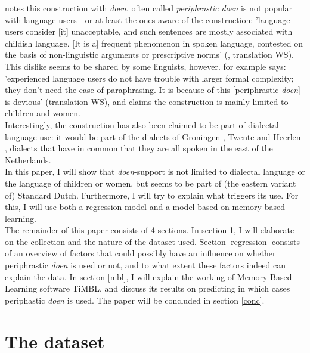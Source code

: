 \documentclass[12pt]{article}
\begin{document}
\citet{g83} notes this construction with \emph{doen}, often called \emph{periphrastic doen} is not popular with language users - or at least the ones aware of the construction: 'language users consider [it] unacceptable, and such sentences are mostly associated with childish language. [It is a] frequent phenomenon in spoken language, contested on the basis of non-linguistic arguments or prescriptive norms' (\citealp[p. 58]{g83}, translation WS).\\\indent
This dislike seems to be shared by some linguists, however. \citet[p. 121]{d94} for example says: 'experienced language users do not have trouble with larger formal complexity; they don't need the ease of paraphrasing. It is because of this [periphrastic \emph{doen}] is devious' (translation WS), and \citet[p. 153]{n62} claims the construction is mainly limited to children and women.\\\indent
Interestingly, the construction has also been claimed to be part of dialectal language use: it would be part of the dialects of Groningen \citep{tl53}, Twente \citep{n62} and Heerlen \citep{c94}, dialects that have in common that they are all spoken in the east of the Netherlands.\\\indent
In this paper, I will show that \emph{doen}-support is not limited to dialectal language or the language of children or women,  but seems to be part of (the eastern variant of) Standard Dutch. Furthermore, I will try to explain what triggers its use. For this, I will use both a regression model and a model based on memory based learning.\\\indent
The remainder of this paper consists of 4 sections. In section \ref{data}, I will elaborate on the collection and the nature of the dataset used. Section \ref{regression} consists of an overview of factors that could possibly have an influence on whether periphrastic \emph{doen} is used or not, and to what extent these factors indeed can explain the data. In section \ref{mbl}, I will explain the working of Memory Based Learning software TiMBL, and discuss its results on predicting in which cases periphastic \emph{doen} is used. The paper will be concluded in section \ref{conc}.






\section{The dataset} \label{data}
\end{document}
